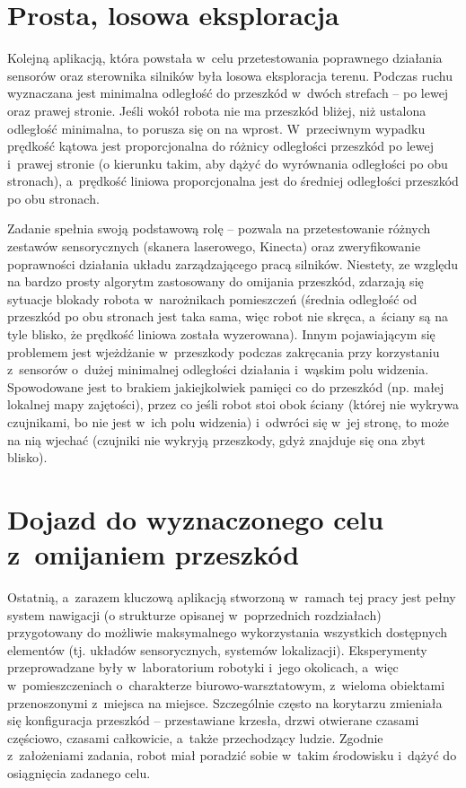 \section{Prosta, losowa eksploracja}

Kolejną aplikacją, która powstała w~celu przetestowania poprawnego działania
sensorów oraz sterownika silników była losowa eksploracja terenu. Podczas
ruchu wyznaczana jest minimalna odległość do przeszkód w~dwóch strefach
-- po lewej oraz prawej stronie. Jeśli wokół robota nie ma przeszkód bliżej,
niż ustalona odległość minimalna, to porusza się on na wprost. W~przeciwnym
wypadku prędkość kątowa jest proporcjonalna do różnicy odległości przeszkód
po lewej i~prawej stronie (o kierunku takim, aby dążyć do wyrównania odległości
po obu stronach), a~prędkość liniowa proporcjonalna jest do średniej odległości
przeszkód po obu stronach.

Zadanie spełnia swoją podstawową rolę -- pozwala na przetestowanie różnych
zestawów sensorycznych (skanera laserowego, Kinecta) oraz zweryfikowanie
poprawności działania układu zarządzającego pracą silników. Niestety, ze względu
na bardzo prosty algorytm zastosowany do omijania przeszkód, zdarzają się sytuacje
blokady robota w~narożnikach pomieszczeń (średnia odległość od przeszkód po
obu stronach jest taka sama, więc robot nie skręca, a~ściany są na tyle blisko,
że prędkość liniowa została wyzerowana). Innym pojawiającym się problemem
jest wjeżdżanie w~przeszkody podczas zakręcania przy korzystaniu z~sensorów
o~dużej minimalnej odległości działania i~wąskim polu widzenia. Spowodowane jest
to brakiem jakiejkolwiek pamięci co do przeszkód (np. małej lokalnej mapy zajętości),
przez co jeśli robot stoi obok ściany (której nie wykrywa czujnikami, bo nie jest
w~ich polu widzenia) i~odwróci się w~jej stronę, to może na nią wjechać (czujniki
nie wykryją przeszkody, gdyż znajduje się ona zbyt blisko).






\section{Dojazd do wyznaczonego celu z~omijaniem przeszkód}

Ostatnią, a~zarazem kluczową aplikacją stworzoną w~ramach tej pracy jest
pełny system nawigacji (o strukturze opisanej w~poprzednich rozdziałach)
przygotowany do możliwie maksymalnego wykorzystania wszystkich dostępnych
elementów (tj. układów sensorycznych, systemów lokalizacji). Eksperymenty
przeprowadzane były w~laboratorium robotyki i~jego okolicach, a~więc w~pomieszczeniach
o~charakterze biurowo-warsztatowym, z~wieloma obiektami przenoszonymi z~miejsca
na miejsce. Szczególnie często na korytarzu zmieniała się konfiguracja przeszkód
-- przestawiane krzesła, drzwi otwierane czasami częściowo, czasami całkowicie,
a~także przechodzący ludzie. Zgodnie z~założeniami zadania, robot miał poradzić
sobie w~takim środowisku i~dążyć do osiągnięcia zadanego celu.

